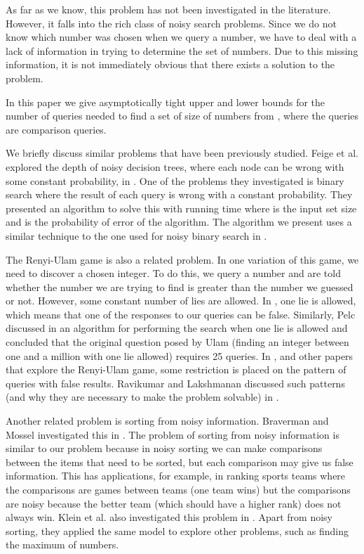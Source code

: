 \documentclass[12pt]{article}
\begin{document}
As far as we know, this problem has not been investigated in the literature. However, it falls into the rich class of noisy search problems. Since we do not know which number was chosen when we query a number, we have to deal with a lack of information in trying to determine the set of numbers. Due to this missing information, it is not immediately obvious that there exists a solution to the problem. 

In this paper we give asymptotically tight upper and lower bounds for the number of queries needed to find a set  of size  of numbers from , where the queries are comparison queries. 

We briefly discuss similar problems that have been previously studied. Feige et al. explored the depth of noisy decision trees, where each node can be wrong with some constant probability, in \cite{Feige}. One of the problems they investigated is binary search where the result of each query is wrong with a constant probability. They presented an algorithm to solve this with running time  where  is the input set size and  is the probability of error of the algorithm. The algorithm we present uses a similar technique to the one used for noisy binary search in \cite{Feige}. 

The Renyi-Ulam game is also a related problem. In one variation of this game, we need to discover a chosen integer. To do this, we query a number and are told whether the number we are trying to find is greater than the number we guessed or not. However, some constant number of lies are allowed. In \cite{Spencer}, one lie is allowed, which means that one of the responses to our queries can be false. Similarly, Pelc discussed in \cite{Pelc} an algorithm for performing the search when one lie is allowed and concluded that the original question posed by Ulam (finding an integer between one and a million with one lie allowed) requires 25 queries. In \cite{Spencer}, \cite{Pelc} and other papers that explore the Renyi-Ulam game, some restriction is placed on the pattern of queries with false results. Ravikumar and Lakshmanan discussed such patterns (and why they are necessary to make the problem solvable) in \cite{Ravikumar}.

Another related problem is sorting from noisy information. Braverman and Mossel investigated this in \cite{Braverman}. The problem of sorting from noisy information is similar to our problem because in noisy sorting we can make comparisons between the items that need to be sorted, but each comparison may give us false information. This has applications, for example, in ranking sports teams where the comparisons are games between teams (one team wins) but the comparisons are noisy because the better team (which should have a higher rank) does not always win. Klein et al. also investigated this problem in \cite{Klein}. Apart from noisy sorting, they applied the same model to explore other problems, such as finding the maximum of  numbers.
\end{document}
